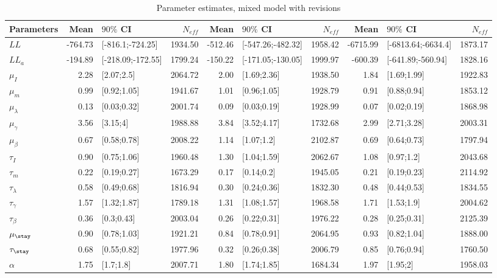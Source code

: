 \begin{table}

\caption{\label{tab:}Parameter estimates, mixed model with revisions}
\centering
\begin{tabular}[t]{lrlrrlrrlr}
\toprule
Parameters & Mean & $90\%$ CI & $N_{eff}$ & Mean & $90\%$ CI & $N_{eff}$ & Mean & $90\%$ CI & $N_{eff}$\\
\midrule
$LL$ & -764.73 & [-816.1;-724.25] & 1934.50 & -512.46 & [-547.26;-482.32] & 1958.42 & -6715.99 & [-6813.64;-6634.4] & 1873.17\\
$LL_a$ & -194.89 & [-218.09;-172.55] & 1799.24 & -150.22 & [-171.05;-130.05] & 1999.97 & -600.39 & [-641.89;-560.94] & 1828.16\\
$\mu_I$ & 2.28 & [2.07;2.5] & 2064.72 & 2.00 & [1.69;2.36] & 1938.50 & 1.84 & [1.69;1.99] & 1922.83\\
$\mu_m$ & 0.99 & [0.92;1.05] & 1941.67 & 1.01 & [0.96;1.05] & 1928.79 & 0.91 & [0.88;0.94] & 1853.12\\
$\mu_\lambda$ & 0.13 & [0.03;0.32] & 2001.74 & 0.09 & [0.03;0.19] & 1928.99 & 0.07 & [0.02;0.19] & 1868.98\\
\addlinespace
$\mu_{\gamma}$ & 3.56 & [3.15;4] & 1988.88 & 3.84 & [3.52;4.17] & 1732.68 & 2.99 & [2.71;3.28] & 2003.31\\
$\mu_{\beta}$ & 0.67 & [0.58;0.78] & 2008.22 & 1.14 & [1.07;1.2] & 2102.87 & 0.69 & [0.64;0.73] & 1797.94\\
$\tau_I$ & 0.90 & [0.75;1.06] & 1960.48 & 1.30 & [1.04;1.59] & 2062.67 & 1.08 & [0.97;1.2] & 2043.68\\
$\tau_m$ & 0.22 & [0.19;0.27] & 1673.29 & 0.17 & [0.14;0.2] & 1945.05 & 0.21 & [0.19;0.23] & 2114.92\\
$\tau_{\lambda}$ & 0.58 & [0.49;0.68] & 1816.94 & 0.30 & [0.24;0.36] & 1832.30 & 0.48 & [0.44;0.53] & 1834.55\\
\addlinespace
$\tau_{\gamma}$ & 1.57 & [1.32;1.87] & 1789.18 & 1.31 & [1.08;1.57] & 1968.58 & 1.71 & [1.53;1.9] & 2004.62\\
$\tau_{\beta}$ & 0.36 & [0.3;0.43] & 2003.04 & 0.26 & [0.22;0.31] & 1976.22 & 0.28 & [0.25;0.31] & 2125.39\\
$\mu_{\stay}$ & 0.90 & [0.78;1.03] & 1921.21 & 0.84 & [0.78;0.91] & 2064.95 & 0.93 & [0.82;1.04] & 1888.00\\
$\tau_{\stay}$ & 0.68 & [0.55;0.82] & 1977.96 & 0.32 & [0.26;0.38] & 2006.79 & 0.85 & [0.76;0.94] & 1760.50\\
$\alpha$ & 1.75 & [1.7;1.8] & 2007.71 & 1.80 & [1.74;1.85] & 1684.34 & 1.97 & [1.95;2] & 1958.03\\
\bottomrule
\end{tabular}
\end{table}
